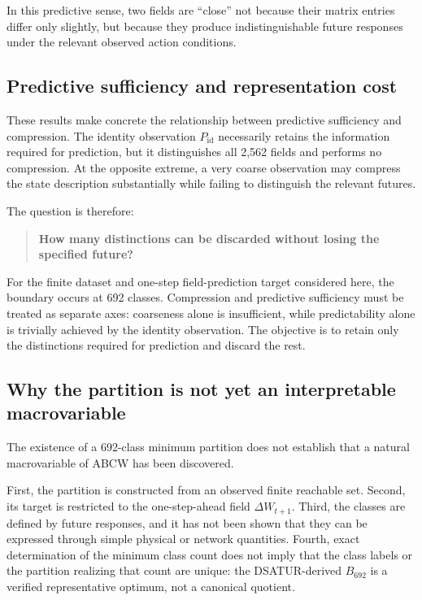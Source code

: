 \documentclass[
  11pt,
]{article}
\begin{document}
In this predictive sense, two fields are ``close'' not because their
matrix entries differ only slightly, but because they produce
indistinguishable future responses under the relevant observed action
conditions.

\hypertarget{predictive-sufficiency-and-representation-cost}{%
\subsection{Predictive sufficiency and representation
cost}\label{predictive-sufficiency-and-representation-cost}}

These results make concrete the relationship between predictive
sufficiency and compression. The identity observation
\({P_{\mathrm{id}}}\) necessarily retains the information required for
prediction, but it distinguishes all 2,562 fields and performs no
compression. At the opposite extreme, a very coarse observation may
compress the state description substantially while failing to
distinguish the relevant futures.

The question is therefore:

\begin{quote}
\textbf{How many distinctions can be discarded without losing the
specified future?}
\end{quote}

For the finite dataset and one-step field-prediction target considered
here, the boundary occurs at 692 classes. Compression and predictive
sufficiency must be treated as separate axes: coarseness alone is
insufficient, while predictability alone is trivially achieved by the
identity observation. The objective is to retain only the distinctions
required for prediction and discard the rest.

\hypertarget{why-the-partition-is-not-yet-an-interpretable-macrovariable}{%
\subsection{Why the partition is not yet an interpretable
macrovariable}\label{why-the-partition-is-not-yet-an-interpretable-macrovariable}}

The existence of a 692-class minimum partition does not establish that a
natural macrovariable of ABCW has been discovered.

First, the partition is constructed from an observed finite reachable
set. Second, its target is restricted to the one-step-ahead field
\({\Delta W_{t+1}}\). Third, the classes are defined by future
responses, and it has not been shown that they can be expressed through
simple physical or network quantities. Fourth, exact determination of
the minimum class count does not imply that the class labels or the
partition realizing that count are unique: the DSATUR-derived
\({B_{692}}\) is a verified representative optimum, not a canonical
quotient.
\end{document}
